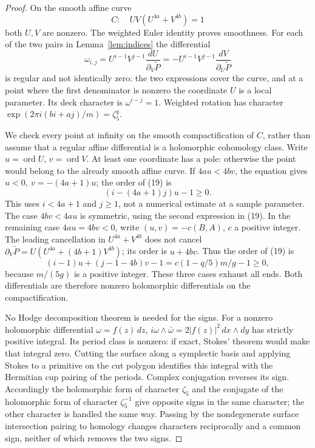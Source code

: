\documentclass[11pt]{article}
\begin{document}
\begin{proof}
On the smooth affine curve
\[
 C:\quad UV(U^{4a}+V^{4b})=1
 \]
both \(U,V\) are nonzero. The weighted Euler identity proves
smoothness. For each of the two pairs in Lemma~\ref{lem:indices}
the differential
\[
 \omega_{i,j}
   =U^{i-1}V^{j-1}\frac{dU}{\partial_V\widetilde P}
   =-U^{i-1}V^{j-1}\frac{dV}{\partial_U\widetilde P}              \tag{19}
\]
is regular and not identically zero: the two expressions cover
the curve, and at a point where the first denominator is nonzero
the coordinate \(U\) is a local parameter. Its deck character is
\(\omega^{i-j}=1\). Weighted rotation has character
\(\exp(2\pi i(bi+aj)/m)=\zeta_5^q\).

We check every point at infinity on the smooth compactification
of \(C\), rather than assume that a regular affine differential
is a holomorphic cohomology class. Write \(u=\operatorname{ord}U\),
\(v=\operatorname{ord}V\). At least one coordinate has a pole:
otherwise the point would belong to the already smooth affine
curve. If \(4au<4bv\), the equation gives
\(u<0,\ v=-(4a+1)u\); the order of (19) is
\[
 (i-(4a+1)j)u-1\ge0.                                         \tag{20}
\]
This uses \(i<4a+1\) and \(j\ge1\), not a numerical estimate
at a sample parameter. The case \(4bv<4au\) is symmetric,
using the second expression in (19).
In the remaining case \(4au=4bv<0\), write
\((u,v)=-c(B,A)\), \(c\) a positive integer.
The leading cancellation in \(U^{4a}+V^{4b}\) does not cancel
\(\partial_V\widetilde P=U(U^{4a}+(4b+1)V^{4b})\);
its order is \(u+4bv\). Thus the order of (19) is
\[
 (i-1)u+(j-1-4b)v-1
   =c(1-q/5)m/g-1\ge0,                                      \tag{21}
\]
because \(m/(5g)\) is a positive integer. These three cases
exhaust all ends. Both differentials are therefore nonzero
holomorphic differentials on the compactification.

No Hodge decomposition theorem is needed for the signs.
For a nonzero holomorphic differential \(\omega=f(z)\,dz\),
\(i\omega\wedge\bar\omega=2|f(z)|^2\,dx\wedge dy\) has strictly
positive integral. Its period class is nonzero: if exact, Stokes'
theorem would make that integral zero. Cutting the surface along
a symplectic basis and applying Stokes to a primitive on the cut
polygon identifies this integral with the Hermitian cup pairing
of the periods. Complex conjugation reverses its sign.
Accordingly the holomorphic form of character \(\zeta_5\) and
the conjugate of the holomorphic form of character
\(\zeta_5^{-1}\) give opposite signs in the same character;
the other character is handled the same way. Passing by the
nondegenerate surface intersection pairing to homology changes
characters reciprocally and a common sign, neither of which
removes the two signs.


\end{proof}
\end{document}
